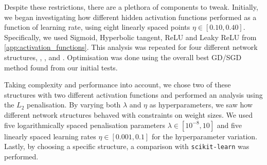     Despite these restrictions, there are a plethora of components to tweak. Initially, we began investigating how different hidden activation functions performed as a function of learning rate, using eight linearly spaced points $\eta \in [0.10, 0.40]$. Specifically, we used Sigmoid, Hyperbolic tangent, ReLU and Leaky ReLU from \cref{app:activation_functions}. This analysis was repeated for four different network structures, , ,  and . Optimisation was done using the overall best GD/SGD method found from our initial tests.  

    Taking complexity and performance into account, we chose two of these structures with two different activation functions and performed an analysis using the $L_2$ penalisation. By varying both $\lambda$ and $\eta$ as hyperparameters, we saw how different network structures behaved with constraints on weight sizes. We used five logarithmically spaced penalisation parameters $\lambda \in [10^{-8}, 10]$ and five linearly spaced learning rates $\eta \in [0.001, 0.1]$ for the hyperparameter variation.  Lastly, by choosing a specific structure, a comparison with \verb|scikit-learn| was performed.